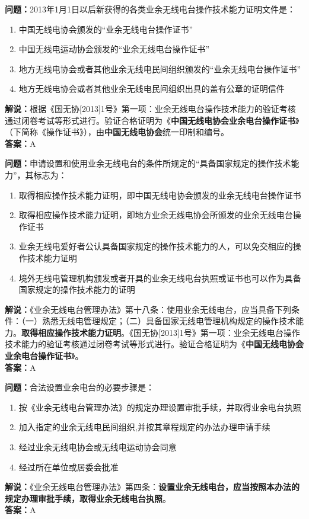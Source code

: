 \textbf{问题：}2013年1月1日以后新获得的各类业余无线电台操作技术能力证明文件是：
\begin{enumerate}[label=\Alph*), leftmargin=1cm]
	\item 中国无线电协会颁发的“业余无线电台操作证书”
	\item 中国无线电运动协会颁发的“业余无线电台操作证书”
	\item 地方无线电协会或者其他业余无线电民间组织颁发的“业余无线电台操作证书”
	\item 地方无线电协会或者其他业余无线电民间组织出具的盖有公章的证明信件
\end{enumerate}
\textbf{解说：}根据《国无协[2013]1号》第一项：业余无线电台操作技术能力的验证考核通过闭卷考试等形式进行。验证合格证明为《\textbf{中国无线电协会业余电台操作证书}》（下简称《操作证书》），由\textbf{中国无线电协会}统一印制和编号。\\\textbf{答案：}A

\textbf{问题：}申请设置和使用业余无线电台的条件所规定的“具备国家规定的操作技术能力”，其标志为：
\begin{enumerate}[label=\Alph*), leftmargin=1cm]
	\item 取得相应操作技术能力证明，即中国无线电协会颁发的业余无线电台操作证书
	\item 取得相应操作技术能力证明，即地方业余无线电协会所颁发的业余无线电台操作证书
	\item 业余无线电爱好者公认具备国家规定的操作技术能力的人，可以免交相应的操作技术能力证明
	\item 境外无线电管理机构颁发或者开具的业余无线电台执照或证书也可以作为具备国家规定的操作技术能力的证明
\end{enumerate}
\textbf{解说：}《业余无线电台管理办法》第十八条：使用业余无线电台，应当具备下列条件：（一）熟悉无线电管理规定；（二）具备国家无线电管理机构规定的操作技术能力。\textbf{取得相应操作技术能力证明}。《国无协[2013]1号》第一项：业余无线电台操作技术能力的验证考核通过闭卷考试等形式进行。验证合格证明为《\textbf{中国无线电协会业余电台操作证书}》。\\\textbf{答案：}A

\textbf{问题：}合法设置业余电台的必要步骤是：
\begin{enumerate}[label=\Alph*), leftmargin=1cm]
	\item 按《业余无线电台管理办法》的规定办理设置审批手续，并取得业余电台执照
	\item 加入指定的业余无线电民间组织,并按其章程规定的办法办理申请手续
	\item 经过业余无线电协会或无线电运动协会同意
	\item 经过所在单位或居委会批准
\end{enumerate}
\textbf{解说：}《业余无线电台管理办法》第四条：\textbf{设置业余无线电台，应当按照本办法的规定办理审批手续，取得业余无线电台执照}。\\\textbf{答案：}A

